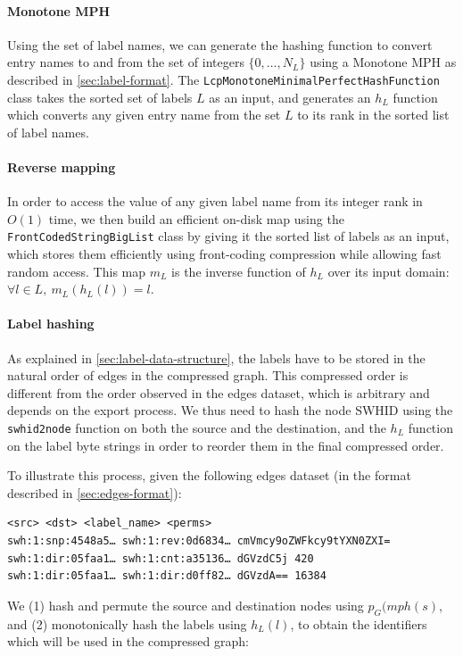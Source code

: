 \paragraph{Monotone MPH}
Using the set of label names, we can generate the hashing function to convert
entry names to and from the set of integers $\{0, \ldots, N_L\}$ using a
Monotone \gls{MPH} as described in \cref{sec:label-format}. The
\texttt{LcpMonotoneMinimalPerfectHashFunction} class takes the sorted set of
labels $L$ as an input, and generates an $h_L$ function which converts any
given entry name from the set $L$ to its rank in the sorted list of label
names.

\paragraph{Reverse mapping}
In order to access the value of any given label name from its integer rank in
$O(1)$ time, we then build an efficient on-disk map using the
\texttt{FrontCodedStringBigList} class by giving it the sorted list of labels
as an input, which stores them efficiently using front-coding compression while
allowing fast random access. This map $m_L$ is the inverse function
of $h_L$ over its input domain: $\forall l \in L,~m_L(h_L(l)) = l$.

\paragraph{Label hashing}
As explained in \cref{sec:label-data-structure}, the labels have to be stored
in the natural order of edges in the compressed graph. This compressed order is
different from the order observed in the edges dataset, which is
arbitrary and depends on the export process. We thus need to hash the node
\gls{SWHID} using the \texttt{swhid2node} function on both the source and the
destination, and the $h_L$ function on the label byte strings in order to
reorder them in the final compressed order.

To illustrate this process, given the following edges dataset (in the format
described in \cref{sec:edges-format}):

\begin{verbatim}
<src> <dst> <label_name> <perms>
swh:1:snp:4548a5… swh:1:rev:0d6834… cmVmcy9oZWFkcy9tYXN0ZXI=
swh:1:dir:05faa1… swh:1:cnt:a35136… dGVzdC5j 420
swh:1:dir:05faa1… swh:1:dir:d0ff82… dGVzdA== 16384
\end{verbatim}

We (1) hash and permute the source and destination nodes using
$p_G(\mathit{mph}(s)$, and (2) monotonically hash the labels using $h_L(l)$, to
obtain the identifiers which will be used in the compressed graph:

